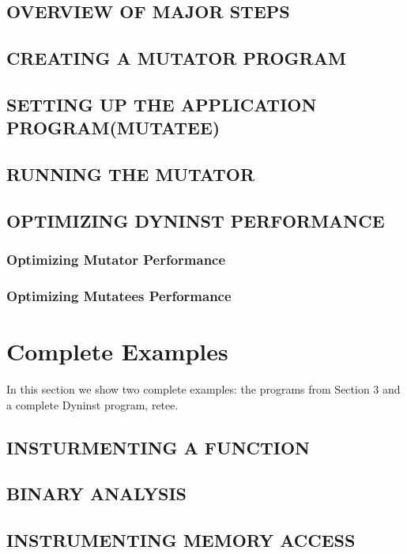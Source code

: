 \documentclass[twopages,a4paper]{article}
\begin{document}
\subsection{OVERVIEW OF MAJOR STEPS}
\subsection{CREATING A MUTATOR PROGRAM}
\subsection{SETTING UP THE APPLICATION PROGRAM(MUTATEE)}
\subsection{RUNNING THE MUTATOR}
\subsection{OPTIMIZING DYNINST PERFORMANCE}
\subsubsection{Optimizing Mutator Performance}
\subsubsection{Optimizing Mutatees Performance}

\appendix
\section{Complete Examples}\label{appdx:complete_examples}
In this section we show two complete examples: the programs from Section 3 and a complete Dyninst program, retee.\\

\subsection{INSTURMENTING A FUNCTION}



\subsection{BINARY ANALYSIS}



\subsection{INSTRUMENTING MEMORY ACCESS}
\end{document}

